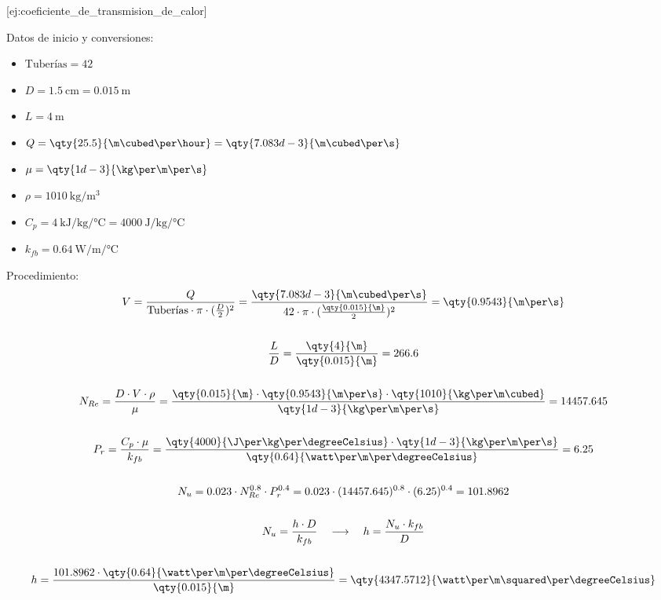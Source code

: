 [ej:coeficiente_de_transmision_de_calor]{
    Datos de inicio y conversiones:
    \begin{itemize}
        \item $\text{Tuberías} = 42$
        \item $D = \qty{1.5}{\cm} = \qty{0.015}{\m}$
        \item $L = \qty{4}{\m}$
        \item $Q = \qty{25.5}{\m\cubed\per\hour} = \qty{7.083d-3}{\m\cubed\per\s}$
        \item $\mu = \qty{1d-3}{\kg\per\m\per\s}$
        \item $\rho = \qty{1010}{\kg\per\m\cubed}$
        \item $C_{p} = \qty{4}{\kilo\J\per\kg\per\degreeCelsius} = \qty{4000}{\J\per\kg\per\degreeCelsius}$
        \item $k_{fb} = \qty{0.64}{\watt\per\m\per\degreeCelsius}$
    \end{itemize}
    Procedimiento:
    \begin{gather*}
        V = \frac{Q}{\text{Tuberías} \cdot \pi \cdot (\frac{D}{2})^{2}} = \frac{\qty{7.083d-3}{\m\cubed\per\s}}{42 \cdot \pi \cdot (\frac{\qty{0.015}{\m}}{2})^{2}} = \qty{0.9543}{\m\per\s}
        \\\\
        \frac{L}{D} = \frac{\qty{4}{\m}}{\qty{0.015}{\m}} = 266.6
        \\\\
        N_{Re} = \frac{D \cdot V \cdot \rho}{\mu} = \frac{\qty{0.015}{\m} \cdot \qty{0.9543}{\m\per\s} \cdot \qty{1010}{\kg\per\m\cubed}}{\qty{1d-3}{\kg\per\m\per\s}} = 14457.645
        \\\\
        P_{r} = \frac{C_{p} \cdot \mu}{k_{fb}} = \frac{\qty{4000}{\J\per\kg\per\degreeCelsius} \cdot \qty{1d-3}{\kg\per\m\per\s}}{\qty{0.64}{\watt\per\m\per\degreeCelsius}} = 6.25
        \\\\    
        N_{u} = 0.023 \cdot N_{Re}^{0.8} \cdot P_{r}^{0.4} = 0.023 \cdot (14457.645)^{0.8} \cdot (6.25)^{0.4} = 101.8962
        \\\\
        N_{u} = \frac{h \cdot D}{k_{fb}} \quad\longrightarrow\quad h = \frac{N_{u} \cdot k_{fb}}{D}
        \\\\
        h = \frac{101.8962 \cdot \qty{0.64}{\watt\per\m\per\degreeCelsius}}{\qty{0.015}{\m}} = \qty{4347.5712}{\watt\per\m\squared\per\degreeCelsius}
    \end{gather*}
}

